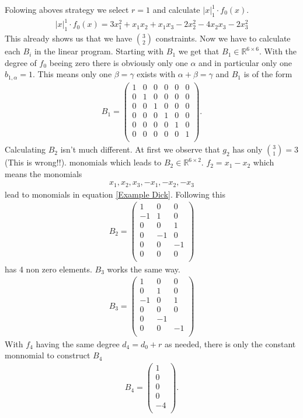 \documentclass[./main.tex]{subfiles}
\begin{document}
Folowing aboves strategy we select $r=1$ and calculate $ \vert x \vert_1^1 \cdot f_0(x)$.
\begin{align}
\label{Example Dick}
 \vert x \vert_1^1 \cdot f_0(x) =  3x_1^2 +x_1x_2 +x_1x_3 -2x_2^2 - 4x_2x_3 - 2x_3^2
\end{align}
This already shows us that we have $\binom{3}{2}$ constraints. Now we have to calculate each $B_i$ in the linear program. Starting with $B_1$ we get that $B_1 \in \mathbb{R}^{6 \times 6}$. With the degree of $f_0$ beeing zero there is obviously only one $\alpha$ and in particular only one $b_{1,\alpha}= 1$. This means only one $\beta = \gamma$ exists with $\alpha + \beta = \gamma$ and $B_1$ is of the form
\begin{align*}
B_1 = \begin{pmatrix}
1&0&0&0&0&0\\
0&1&0&0&0&0\\
0&0&1&0&0&0\\
0&0&0&1&0&0\\
0&0&0&0&1&0\\
0&0&0&0&0&1\\
\end{pmatrix}.
\end{align*}
Calculating $B_2$ isn't much different. At first we observe that $g_2$ has only $\binom 3 1 = 3 $ (This is wrong!!). monomials which leads to $B_2 \in \mathbb{R}^{6 \times 2}$. $f_2 = x_1 -x_2$ which means the monomials
\begin{align*}
x_1,x_2,x_3,-x_1,-x_2,-x_3
\end{align*}
lead to monomials in equation \ref{Example Dick}. Following this 
\begin{align*}
B_2 = \begin{pmatrix}
1&0&0\\
-1&1&0\\
0&0&1\\
0&-1&0\\
0&0&-1\\
0&0&0\\
\end{pmatrix}
\end{align*}
has 4 non zero elements. $B_3$ works the same way.
\begin{align*}
B_3 = \begin{pmatrix}
1&0&0\\
0&1&0\\
-1&0&1\\
0&0&0\\
0&-1&\\
0&0&-1\\
\end{pmatrix}
\end{align*}
With $f_4$ having the same degree $d_4=d_0+r$ as needed, there is only the constant monnomial to construct $B_4$
\begin{align*}
B_4 = \begin{pmatrix}
1\\
0\\
0\\
0\\
-4\\
\end{pmatrix}.
\end{align*}
\end{document}
